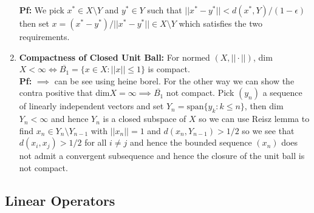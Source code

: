 \documentclass{article}
\begin{document}
\begin{enumerate}
    \textbf{Pf:} We pick \(x^* \in X \setminus Y\) and \(y^* \in Y\) such that \(||x^* -y^*|| < d(x^*, Y)/(1 - \epsilon)\) then set \(x = (x^* -y^*)/||x^* -y^*|| \in X \setminus Y\) which satisfies the two requirements.

    \item \textbf{Compactness of Closed Unit Ball:} For normed \((X, ||\cdot||)\), dim\( X < \infty \iff \overline{B_1} = \{x \in X: ||x||\leq 1\}\) is compact.\\
    
    \textbf{Pf:} \(\implies \) can be see using heine borel. For the other way we can show the contra positive that dim\(X = \infty \implies \overline{B_1}\) not compact. Pick \((y_n)\) a sequence of linearly independent vectors and set \(Y_n = \text{span}\{y_k:k\leq n\}\), then dim\(Y_n < \infty\) and hence \(Y_n\) is a closed subspace of \(X\) so we can use Reisz lemma to find \(x_n \in Y_n \setminus Y_{n-1}\) with \(||x_n|| = 1\) and \(d(x_n, Y_{n-1}) > 1/2\) so we see that \(d(x_i, x_j) > 1/2\) for all \(i \neq j\) and hence the bounded sequence \((x_n)\) does not admit a convergent subsequence and hence the closure of the unit ball is not compact.
    
\end{enumerate}

\subsection*{Linear Operators}
\end{document}
